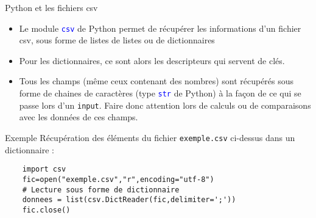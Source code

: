 \documentclass[10pt]{beamer}
\begin{document}
\begin{frame}
	\mframe{\DB}
	\begin{block}{Python et les fichiers csv}
		\begin{itemize}
			\item<1-> Le module \textcolor{blue}{\tt csv} de Python permet de récupérer les informations d'un fichier csv, sous forme de listes de listes ou de dictionnaires
			\item<2-> Pour les dictionnaires, ce sont alors les  descripteurs qui servent de clés.
			\item<3-> Tous les champs (même ceux contenant des nombres) sont récupérés sous forme de chaines de caractères (type \textcolor{blue}{\tt str} de Python) à la façon de ce qui se passe lors d'un {\tt input}. Faire donc attention lors de calculs ou de comparaisons avec les données de ces champs.
		\end{itemize}
	\end{block}
\end{frame}

\begin{frame}[fragile]
	\mframe{\DB}
	\begin{exampleblock}{Exemple}
		Récupération des éléments du fichier {\tt exemple.csv} ci-dessus dans un dictionnaire :
		\begin{lstlisting}	
	import csv
	fic=open("exemple.csv","r",encoding="utf-8")
	# Lecture sous forme de dictionnaire 
	donnees = list(csv.DictReader(fic,delimiter=';'))
	fic.close()
	\end{lstlisting}
	\end{exampleblock}
\end{frame}
\end{document}
